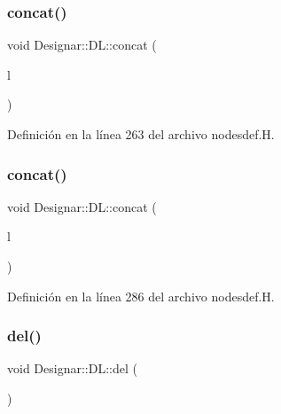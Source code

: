 \subsubsection{\texorpdfstring{concat()}{concat()}\hspace{0.1cm}{\footnotesize\ttfamily [1/2]}}
{\footnotesize\ttfamily void Designar\+::\+D\+L\+::concat (\begin{DoxyParamCaption}\item[{\hyperlink{class_designar_1_1_d_l}{DL} $\ast$}]{l }\end{DoxyParamCaption})\hspace{0.3cm}{\ttfamily [inline]}}



Definición en la línea 263 del archivo nodesdef.\+H.

\mbox{\label{class_designar_1_1_d_l_ad952d602d2beded2a8f922289fe16d7f}} 
\subsubsection{\texorpdfstring{concat()}{concat()}\hspace{0.1cm}{\footnotesize\ttfamily [2/2]}}
{\footnotesize\ttfamily void Designar\+::\+D\+L\+::concat (\begin{DoxyParamCaption}\item[{\hyperlink{class_designar_1_1_d_l}{DL} \&}]{l }\end{DoxyParamCaption})\hspace{0.3cm}{\ttfamily [inline]}}



Definición en la línea 286 del archivo nodesdef.\+H.

\mbox{\label{class_designar_1_1_d_l_affc0a48f00bd2ff8a6899c2a0c3d0ae3}} 
\subsubsection{\texorpdfstring{del()}{del()}}
{\footnotesize\ttfamily void Designar\+::\+D\+L\+::del (\begin{DoxyParamCaption}{ }\end{DoxyParamCaption})\hspace{0.3cm}{\ttfamily [inline]}}



